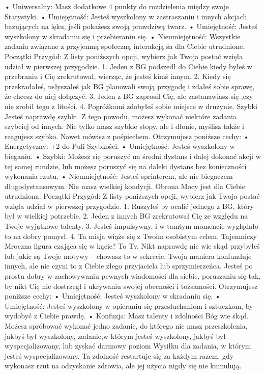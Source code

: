     • Uniwersalny: Masz dodatkowe 4 punkty do rozdzielenia między swoje Statystyki.
    • Umiejętność: Jesteś wyszkolony w zastraszaniu i innych akcjach bazujących na lęku, jeśli pokażesz swoją prawdziwą twarz.
    • Umiejętność: Jesteś wyszkolony w skradaniu się i przebieraniu się.
    • Nieumiejętność: Wszystkie zadania związane z przyjemną społeczną interakcją śa dla Ciebie utrudnione.
Początki Przygód: Z listy poniższych opcji, wybierz jak Twoja postać wzięła udział w pierwszej przygodzie.
1. Jeden z BG podszedł do Ciebie kiedy byłeś w przebraniu i Cię zrekrutował, wierząc, że jesteś kimś innym.
2. Kiedy się przekradałeś, usłyszałeś jak BG planowali swoją przygodę i zdałeś sobie sprawę, że chcesz do niej dołączyć.
3. Jeden z BG zaprosił Cię, ale zastanawiasz się ,czy nie zrobił tego z litości.
4. Pogróżkami zdobyłeś sobie miejsce w drużynie.
Szybki
Jesteś naprawdę szybki. Z tego powodu, możesz wykonać niektóre zadania szybciej od innych. Nie tylko masz szybkie stopy, ale i dłonie, myślisz także i reagujesz szybko. Nawet mówisz z pośpiechem. 
Otrzymujesz poniższe cechy:
    • Energetyczny: +2 do Puli Szybkości.
    • Umiejętność: Jesteś wyszkolony w bieganiu.
    • Szybki: Możesz się poruszyć na średni dystans i dalej dokonać akcji w tej samej rundzie, lub możesz poruszyć się na daleki dystans bez konieczności wykonania rzutu.
    • Nieumiejętność: Jesteś sprinterem, ale nie biegaczem długodystansowym. Nie masz wielkiej kondycji. Obrona Mocy jest dla Ciebie utrudniona.
Początki Przygód: Z listy poniższych opcji, wybierz jak Twoja postać wzięła udział w pierwszej przygodzie.
1. Ruszyłeś by ocalić jednego z BG, który był w wielkiej potrzebie.
2. Jeden z innych BG zrekrutował Cię ze względu na Twoje wyjątkowe talenty.
3. Jesteś impulsywny, i w tamtym momencie wyglądało to na dobry pomysł.
4. Ta misja wiąże się z Twoim osobistym celem.
Tajemniczy
Mroczna figura czająca się w kącie? To Ty. Nikt naprawdę nie wie skąd przybyłeś lub jakie są Twoje motywy – chowasz to w sekrecie. Twoja maniera konfunduje innych, ale nie czyni to z Ciebie złego przyjaciela lub sprzymierzeńca. Jesteś po prostu dobry w zachowywaniu pewnych wiadomości dla siebie, poruszaniu się tak, by nikt Cię nie dostrzegł i ukrywaniu swojej obecności i tożsamości.
Otrzymujesz poniższe cechy:
    • Umiejętność: Jesteś wyszkolony w skradaniu się.
    • Umiejętność: Jesteś wyszkolony w opieraniu się przesłuchaniom i sztuczkom, by wydobyć z Ciebie prawdę.
    • Konfuzja: Masz talenty i zdolności Bóg wie skąd. Możesz spróbować wykonać jedno zadanie, do którego nie masz przeszkolenia, jakbyś był wyszkolony, zadanie,w którym jesteś wyszkolony, jakbyś był wyspecjalizowany, lub zyskać darmowy poziom Wysiłku dla zadania, w którym jesteś wyspecjalizowany. Ta zdolność restartuje się za każdym razem, gdy wykonasz rzut na odzyskanie zdrowia, ale jej użycia nigdy się nie kumulują.

